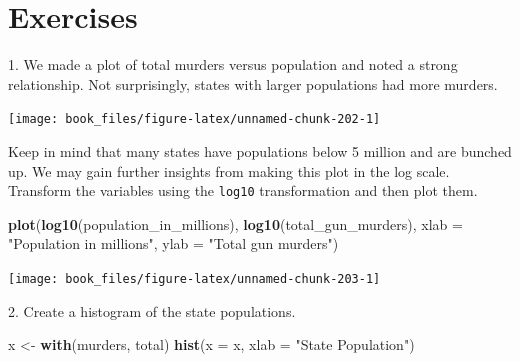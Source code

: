 \documentclass[
]{krantz}
\newenvironment{Shaded}{\begin{snugshade}}{\end{snugshade}}
\newcommand{\DataTypeTok}[1]{\textcolor[rgb]{0.27,0.27,0.27}{#1}}
\newcommand{\DecValTok}[1]{\textcolor[rgb]{0.06,0.06,0.06}{#1}}
\newcommand{\KeywordTok}[1]{\textcolor[rgb]{0.27,0.27,0.27}{\textbf{#1}}}
\newcommand{\NormalTok}[1]{#1}
\newcommand{\OperatorTok}[1]{\textcolor[rgb]{0.43,0.43,0.43}{\textbf{#1}}}
\newcommand{\StringTok}[1]{\textcolor[rgb]{0.5,0.5,0.5}{#1}}
\begin{document}
\hypertarget{exercises-6}{%
\section{Exercises}\label{exercises-6}}

1. We made a plot of total murders versus population and noted a strong relationship. Not surprisingly, states with larger populations had more murders.

\begin{Shaded}
\end{Shaded}

\begin{center}\texttt{[image: book\_files/figure-latex/unnamed-chunk-202-1]} \end{center}

Keep in mind that many states have populations below 5 million and are bunched up. We may gain further insights from making this plot in the log scale. Transform the variables using the \texttt{log10} transformation and then plot them.

\begin{Shaded}
\begin{Highlighting}[]
\KeywordTok{plot}\NormalTok{(}\KeywordTok{log10}\NormalTok{(population_in_millions), }\KeywordTok{log10}\NormalTok{(total_gun_murders), }\DataTypeTok{xlab =} \StringTok{"Population in millions"}\NormalTok{, }\DataTypeTok{ylab =} \StringTok{"Total gun murders"}\NormalTok{)}
\end{Highlighting}
\end{Shaded}

\begin{center}\texttt{[image: book\_files/figure-latex/unnamed-chunk-203-1]} \end{center}

2. Create a histogram of the state populations.

\begin{Shaded}
\begin{Highlighting}[]
\NormalTok{x <-}\StringTok{ }\KeywordTok{with}\NormalTok{(murders, total)}
\KeywordTok{hist}\NormalTok{(}\DataTypeTok{x =}\NormalTok{ x, }\DataTypeTok{xlab =} \StringTok{"State Population"}\NormalTok{)}
\end{Highlighting}
\end{Shaded}
\end{document}
